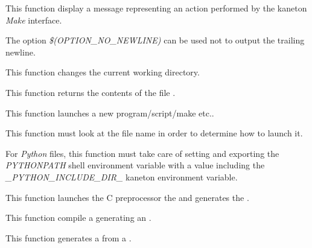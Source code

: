          {
	   This function display a message representing an action performed
	   by the kaneton \textit{Make} interface.

	   \-

	   The option \textit{\$(OPTION\_NO\_NEWLINE)} can be used not to
	   output the trailing newline.
	 }

         {
	   This function changes the current working directory.
	 }

         {
	   This function returns the contents of the file .
	 }

         {
	   This function launches a new program/script/make etc..

	   \-

	   This function must look at the file name in order to determine
	   how to launch it.

	   \-

	   For \textit{Python} files, this function must take care of
	   setting and exporting the \textit{PYTHONPATH} shell environment
	   variable with a value including the
	   \textit{\_PYTHON\_INCLUDE\_DIR\_} kaneton environment variable.
	 }

         {
	   This function launches the C preprocessor the 
	   and generates the .
	 }

         {
	   This function compile a  generating an
	   .
	 }

         {
	   This function generates a  from a
	   .
	 }

